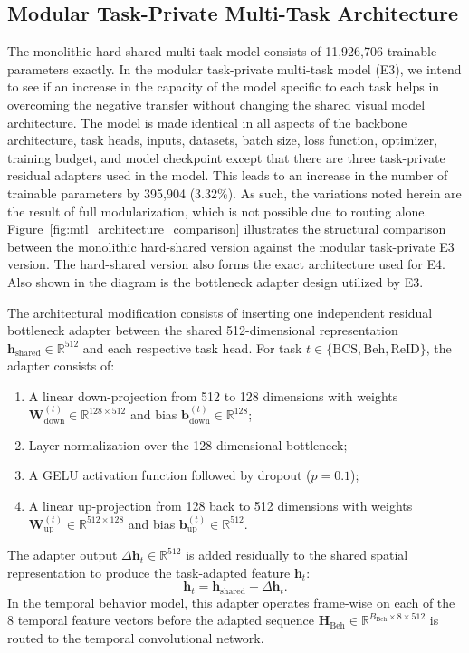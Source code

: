 \subsection{Modular Task-Private Multi-Task Architecture}

The monolithic hard-shared multi-task model consists of 11,926,706 trainable parameters exactly. In the modular task-private multi-task model (E3), we intend to see if an increase in the capacity of the model specific to each task helps in overcoming the negative transfer without changing the shared visual model architecture. The model is made identical in all aspects of the backbone architecture, task heads, inputs, datasets, batch size, loss function, optimizer, training budget, and model checkpoint except that there are three task-private residual adapters used in the model. This leads to an increase in the number of trainable parameters by 395,904 (3.32\%). As such, the variations noted herein are the result of full modularization, which is not possible due to routing alone. Figure~\ref{fig:mtl_architecture_comparison} illustrates the structural comparison between the monolithic hard-shared version against the modular task-private E3 version. The hard-shared version also forms the exact architecture used for E4. Also shown in the diagram is the bottleneck adapter design utilized by E3.



The architectural modification consists of inserting one independent residual bottleneck adapter between the shared 512-dimensional representation $\mathbf{h}_{\mathrm{shared}} \in \mathbb{R}^{512}$ and each respective task head. For task $t \in \{\mathrm{BCS}, \mathrm{Beh}, \mathrm{ReID}\}$, the adapter consists of:
\begin{enumerate}
 \item A linear down-projection from 512 to 128 dimensions with weights $\mathbf{W}_{\mathrm{down}}^{(t)} \in \mathbb{R}^{128 \times 512}$ and bias $\mathbf{b}_{\mathrm{down}}^{(t)} \in \mathbb{R}^{128}$;
 \item Layer normalization over the 128-dimensional bottleneck;
 \item A GELU activation function followed by dropout ($p = 0.1$);
 \item A linear up-projection from 128 back to 512 dimensions with weights $\mathbf{W}_{\mathrm{up}}^{(t)} \in \mathbb{R}^{512 \times 128}$ and bias $\mathbf{b}_{\mathrm{up}}^{(t)} \in \mathbb{R}^{512}$.
\end{enumerate}
The adapter output $\Delta\mathbf{h}_t \in \mathbb{R}^{512}$ is added residually to the shared spatial representation to produce the task-adapted feature $\mathbf{h}_t$:
\begin{equation}
 \mathbf{h}_t = \mathbf{h}_{\mathrm{shared}} + \Delta\mathbf{h}_t.
\end{equation}
In the temporal behavior model, this adapter operates frame-wise on each of the 8 temporal feature vectors before the adapted sequence $\mathbf{H}_{\mathrm{Beh}} \in \mathbb{R}^{B_{\mathrm{Beh}} \times 8 \times 512}$ is routed to the temporal convolutional network.

